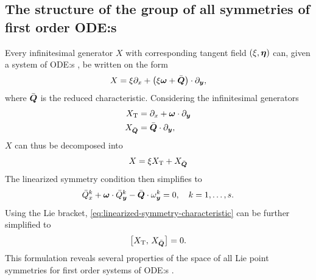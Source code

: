 \subsection{The structure of the group of all symmetries of first order ODE:s}

Every infinitesimal generator \(X\) with corresponding tangent field \((\xi, \boldsymbol{\eta})\) can, given a system of ODE:s , be written on the form
\begin{equation*}
  X = \xi \partial_x + \left(\xi \vect{\omega} + \bar{\vect{Q}}\right) \cdot \partial_{\vect{y}},
\end{equation*}
where \(\bar{\boldsymbol{Q}}\) is the reduced characteristic.
Considering the infinitesimal generators
\begin{subequations}
  \begin{align}
    X_{\text{T}} &= \partial_x + \boldsymbol{\omega} \cdot \partial_{\boldsymbol{y}} \label{eq:trivial-generator-base}\\
    X_{\bar{\boldsymbol{Q}}} &= \bar{\boldsymbol{Q}} \cdot \partial_{\boldsymbol{y}},
  \end{align}
\end{subequations}
\(X\) can thus be decomposed into
\begin{equation} \label{eq:inf-gen-decomposition}
  X = \xi X_{\text{T}} + X_{\bar{\boldsymbol{Q}}}
\end{equation}
The linearized symmetry condition  then simplifies to
\begin{equation} \label{eq:linearized-symmetry-characteristic}
  \bar{Q}_x^k + \boldsymbol{\omega} \cdot \bar{Q}_{\boldsymbol{y}}^k - \bar{\boldsymbol{Q}} \cdot \omega_{\boldsymbol{y}}^k = 0 ,\quad k = 1, \dots, s.
\end{equation}
Using the Lie bracket, \cref{eq:linearized-symmetry-characteristic} can be further simplified to
\begin{equation} \label{eq:linearized-symmetry-bracket}
  \comm{X_{\text{T}}}{X_{\bar{\vect{Q}}}} = 0.
\end{equation}
This formulation reveals several properties of the space of all Lie point symmetries for first order systems of ODE:s .

